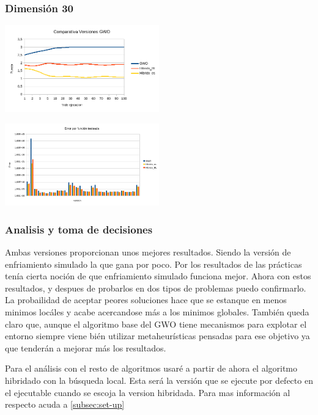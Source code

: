 \documentclass[a4paper, 12.5pt]{report}
\begin{document}
\subsubsection*{Dimensión 30}

\includegraphics*[width=0.5\textwidth]{Resultados/hibrido/Interno/D30/media_posicion.png} \label{img:media_posicion_D30_comparativa}



\includegraphics*[width=0.5\textwidth]{Resultados/hibrido/Interno/D30/ev_error.png} \label{img:error_D30_comparativa}

\subsubsection*{Analisis y toma de decisiones}
Ambas versiones proporcionan unos mejores resultados. Siendo la versión de enfriamiento simulado la que gana por poco. Por los resultados de las prácticas tenía cierta noción de que enfriamiento simulado funciona mejor. Ahora con estos resultados, y despues de probarlos en dos tipos de problemas puedo confirmarlo. La probailidad de aceptar peores soluciones hace que se estanque en menos minimos locáles y acabe acercandose más a los minimos globales. También queda claro que, aunque el algoritmo base del GWO tiene mecanismos para explotar el entorno siempre viene bién utilizar metaheurísticas pensadas para ese objetivo ya que tenderán a mejorar más los resultados.

Para el análisis con el resto de algoritmos usaré a partir de ahora el algoritmo hibridado con la búsqueda local. Esta será la versión que se ejecute por defecto en el ejecutable cuando se escoja la version hibridada. Para mas información al respecto acuda a \ref{subsec:set-up}
\end{document}
